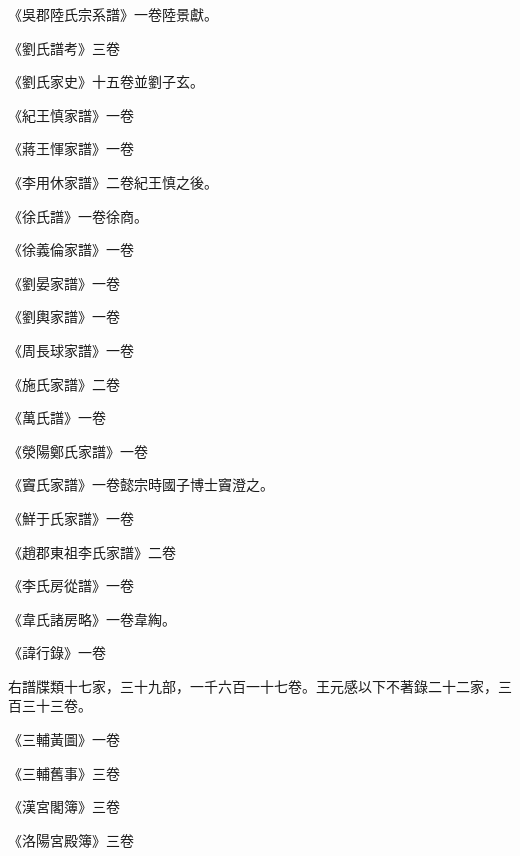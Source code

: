 \begin{pinyinscope}
 《吳郡陸氏宗系譜》一卷陸景獻。



 《劉氏譜考》三卷



 《劉氏家史》十五卷並劉子玄。



 《紀王慎家譜》一卷



 《蔣王惲家譜》一卷



 《李用休家譜》二卷紀王慎之後。



 《徐氏譜》一卷徐商。



 《徐義倫家譜》一卷



 《劉晏家譜》一卷



 《劉輿家譜》一卷



 《周長球家譜》一卷



 《施氏家譜》二卷



 《萬氏譜》一卷



 《滎陽鄭氏家譜》一卷



 《竇氏家譜》一卷懿宗時國子博士竇澄之。



 《鮮于氏家譜》一卷



 《趙郡東祖李氏家譜》二卷



 《李氏房從譜》一卷



 《韋氏諸房略》一卷韋綯。



 《諱行錄》一卷



 右譜牒類十七家，三十九部，一千六百一十七卷。王元感以下不著錄二十二家，三百三十三卷。



 《三輔黃圖》一卷



 《三輔舊事》三卷



 《漢宮閣簿》三卷



 《洛陽宮殿簿》三卷




\end{pinyinscope}
